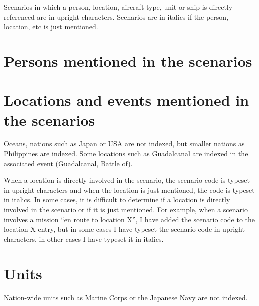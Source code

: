 \documentclass[a4paper,twocolumn]{article}
\begin{document}
Scenarios in which a person, location, aircraft type, unit or ship is
directly referenced are in upright characters. Scenarios are in
italics if the person, location, etc is just mentioned.

\sloppy
\section*{Persons mentioned in the scenarios}

\fussy
\begin{hangparas}{4mm}{1}
\end{hangparas}

\section*{Locations and events mentioned in the scenarios}

Oceans, nations such as Japan or USA are not indexed, but smaller
nations as Philippines are indexed. Some locations such as Guadalcanal
are indexed in the associated event (Guadalcanal, Battle of).

\vspace{2mm}

When a location is directly involved in the scenario, the scenario
code is typeset in upright characters and when the location is just
mentioned, the code is typeset in italics. In some cases, it is
difficult to determine if a location is directly involved in the
scenario or if it is just mentioned. For example, when a scenario
involves a mission ``en route to location X'', I have added the
scenario code to the location X entry, but in some cases I have
typeset the scenario code in upright characters, in other cases I have
typeset it in italics.

\vspace{2mm}

\begin{hangparas}{4mm}{1}
\end{hangparas}

\section*{Units}

Nation-wide units such as Marine Corps or the Japanese Navy are not indexed.

\vspace{2mm}

\begin{hangparas}{4mm}{1}
\end{hangparas}
\end{document}
